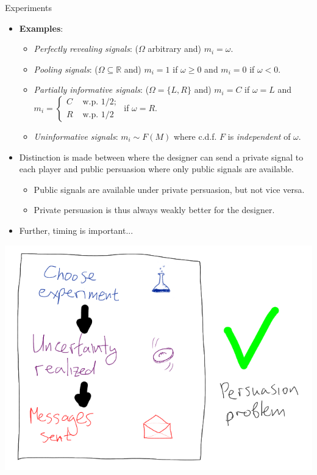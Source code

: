\documentclass[english,10pt
,aspectratio=169
]{beamer}
\begin{document}
\begin{frame}{Experiments}
\begin{itemize}
	\item \textbf{Examples}:
	\begin{itemize}
		\item \emph{Perfectly revealing signals}: ($\Omega$ arbitrary and) $m_i = \omega$.
		\item \emph{Pooling signals}: ($\Omega \subseteq \mathbb{R}$ and) $m_i = 1$ if $\omega \geq 0$ and $m_i = 0$ if $\omega < 0$.
		\item \emph{Partially informative signals}: ($\Omega=\{L,R\}$ and) $m_i = C$ if $\omega = L$ and $m_i = 
		\begin{cases}
			C & \text{ w.p. }1/2; \\ R & \text{ w.p. }1/2
		\end{cases}$
		if $\omega=R$.
		\item \emph{Uninformative signals}: $m_i \sim F(M)$ where c.d.f. $F$ is \emph{independent} of $\omega$.
	\end{itemize}
	\item Distinction is made between  where the designer can send a private signal to each player and \alert{public persuasion} where only public signals are available.
	\begin{itemize}
		\item Public signals are available under private persuasion, but not vice versa.
		\item Private persuasion is thus always weakly better for the designer.
	\end{itemize}
	\item Further, timing is important...
\end{itemize}
\end{frame}


\begin{frame}
	\centering
	\includegraphics[scale=0.7]{pics/M7/timing1}
\end{frame}
\end{document}

